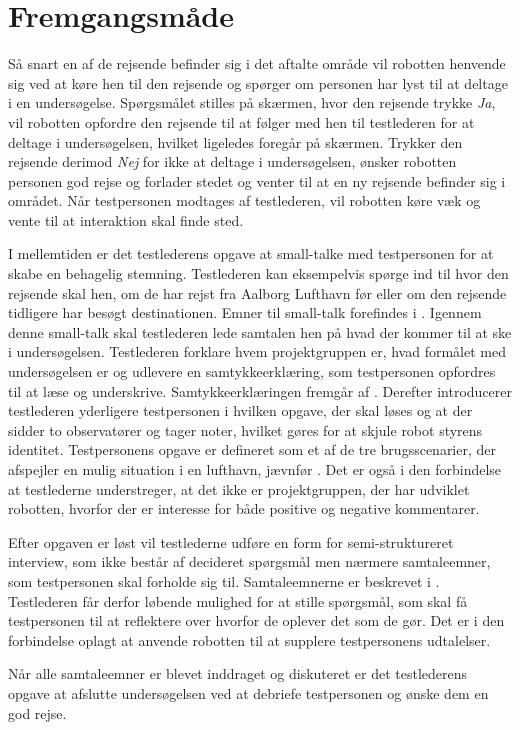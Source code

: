 \section{Fremgangsmåde}
\label{ParametreFremgangsmaade}
%
Så snart en af de rejsende befinder sig i det aftalte område vil robotten henvende sig ved at køre hen til den rejsende og spørger om personen har lyst til at deltage i en undersøgelse. Spørgsmålet stilles på skærmen, hvor den rejsende trykke \textit{Ja}, vil robotten opfordre den rejsende til at følger med hen til testlederen for at deltage i undersøgelsen, hvilket ligeledes foregår på skærmen. Trykker den rejsende derimod \textit{Nej} for ikke at deltage i undersøgelsen, ønsker robotten personen god rejse og forlader stedet og venter til at en ny rejsende befinder sig i området. Når testpersonen modtages af testlederen, vil robotten køre væk og vente til at interaktion skal finde sted. 

I mellemtiden er det testlederens opgave at small-talke med testpersonen for at skabe en behagelig stemning. Testlederen kan eksempelvis spørge ind til hvor den rejsende skal hen, om de har rejst fra Aalborg Lufthavn før eller om den rejsende tidligere har besøgt destinationen. Emner til small-talk forefindes i . Igennem denne small-talk skal testlederen lede samtalen hen på hvad der kommer til at ske i undersøgelsen. Testlederen forklare hvem projektgruppen er, hvad formålet med undersøgelsen er og udlevere en samtykkeerklæring, som testpersonen opfordres til at læse og underskrive. Samtykkeerklæringen fremgår af . Derefter introducerer testlederen yderligere testpersonen i hvilken opgave, der skal løses og at der sidder to observatører og tager noter, hvilket gøres for at skjule robot styrens identitet. Testpersonens opgave er defineret som et af de tre brugsscenarier, der afspejler en mulig situation i en lufthavn, jævnfør . Det er også i den forbindelse at testlederne understreger, at det ikke er projektgruppen, der har udviklet robotten, hvorfor der er interesse for både positive og negative kommentarer. 

Efter opgaven er løst vil testlederne udføre en form for semi-struktureret interview, som ikke består af decideret spørgsmål men nærmere samtaleemner, som testpersonen skal forholde sig til. Samtaleemnerne er beskrevet i . Testlederen får derfor løbende mulighed for at stille spørgsmål, som skal få testpersonen til at reflektere over hvorfor de oplever det som de gør. Det er i den forbindelse oplagt at anvende robotten til at supplere testpersonens udtalelser. 

Når alle samtaleemner er blevet inddraget og diskuteret er det testlederens opgave at afslutte undersøgelsen ved at debriefe testpersonen og ønske dem en god rejse.       



